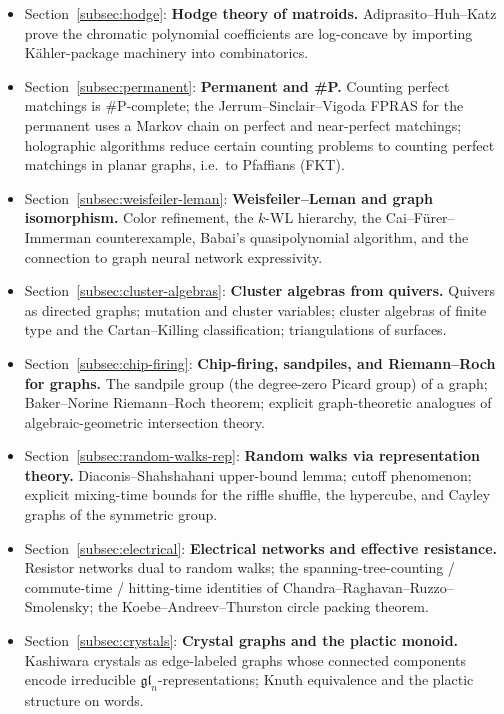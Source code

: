 \begin{itemize}
  \item Section~\ref{subsec:hodge}: \textbf{Hodge theory of matroids.} Adiprasito--Huh--Katz
        prove the chromatic polynomial coefficients are log-concave by
        importing K\"ahler-package machinery into combinatorics.
  \item Section~\ref{subsec:permanent}: \textbf{Permanent and \#P.} Counting perfect matchings
        is \#P-complete; the Jerrum--Sinclair--Vigoda FPRAS for the
        permanent uses a Markov chain on perfect and near-perfect
        matchings; holographic algorithms reduce certain counting
        problems to counting perfect matchings in planar graphs, i.e.\
        to Pfaffians (FKT).
  \item Section~\ref{subsec:weisfeiler-leman}: \textbf{Weisfeiler--Leman and graph isomorphism.}
        Color refinement, the $k$-WL hierarchy, the
        Cai--F\"urer--Immerman counterexample, Babai's quasipolynomial
        algorithm, and the connection to graph neural network
        expressivity.
  \item Section~\ref{subsec:cluster-algebras}: \textbf{Cluster algebras from quivers.} Quivers as
        directed graphs; mutation and cluster variables; cluster
        algebras of finite type and the Cartan--Killing classification;
        triangulations of surfaces.
  \item Section~\ref{subsec:chip-firing}: \textbf{Chip-firing, sandpiles, and Riemann--Roch for
        graphs.} The sandpile group (the degree-zero Picard group) of a
        graph; Baker--Norine
        Riemann--Roch theorem; explicit graph-theoretic analogues of
        algebraic-geometric intersection theory.
  \item Section~\ref{subsec:random-walks-rep}: \textbf{Random walks via representation theory.}
        Diaconis--Shahshahani upper-bound lemma; cutoff phenomenon;
        explicit mixing-time bounds for the riffle shuffle, the
        hypercube, and Cayley graphs of the symmetric group.
  \item Section~\ref{subsec:electrical}: \textbf{Electrical networks and effective
        resistance.} Resistor networks dual to random walks; the
        spanning-tree-counting / commute-time / hitting-time identities
        of Chandra--Raghavan--Ruzzo--Smolensky; the
        Koebe--Andreev--Thurston circle packing theorem.
  \item Section~\ref{subsec:crystals}: \textbf{Crystal graphs and the plactic monoid.}
        Kashiwara crystals as edge-labeled graphs whose connected
        components encode irreducible $\mathfrak{gl}_n$-representations;
        Knuth equivalence and the plactic structure on words.
\end{itemize}


